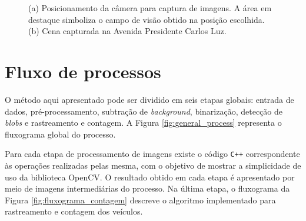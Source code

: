 \begin{figure}[ht]
\begin{center}
\begin{subfigure}[b]{.49\textwidth}
\begin{center}
      \end{center}
      \caption{}
      \label{fig:original_frame}
    \end{subfigure}
  \end{center}
  \caption{(a) Posicionamento da câmera para captura de imagens. A área em destaque simboliza o campo de visão obtido na posição escolhida. (b) Cena capturada na Avenida Presidente Carlos Luz.}
  \label{fig:cena}
\end{figure}


\section{Fluxo de processos} %
\label{sec:fluxo_de_processos}

O método aqui apresentado pode ser dividido em seis etapas globais: entrada de dados, pré-processamento, subtração de \textit{background}, binarização, detecção de \textit{blobs} e rastreamento e contagem. A Figura \ref{fig:general_process} representa o fluxograma global do processo.

Para cada etapa de processamento de imagens existe o código \verb!C++! correspondente às operações realizadas pelas mesma, com o objetivo de mostrar a simplicidade de uso da biblioteca OpenCV. O resultado obtido em cada etapa é apresentado por meio de imagens intermediárias do processo. Na última etapa, o fluxograma da Figura \ref{fig:fluxograma_contagem} descreve o algoritmo implementado para rastreamento e contagem dos veículos.


